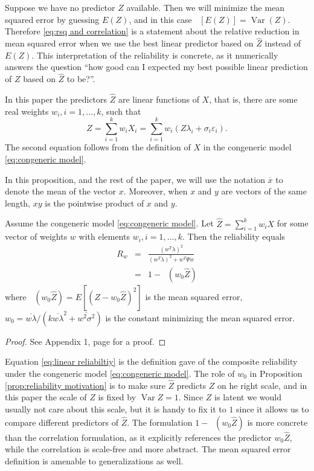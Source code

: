 \documentclass[twoside]{article}
\DeclareMathOperator{\Var}{Var}
\DeclareMathOperator{\MSE}{MSE_Z}
\begin{document}
Suppose we have no predictor $\hat{Z}$ available. Then we will minimize the mean squared error by guessing $E(Z)$, and in this case $\MSE[E(Z)]=\Var(Z)$. Therefore \cref{eq:rsq and correlation} is a statement about the relative reduction in mean squared error when we use the best linear predictor based on $\hat{Z}$ instead of $E(Z)$. This interpretation of the reliability is concrete, as it numerically answers the question ``how good can I expected my best possible linear prediction of $Z$ based on $\hat{Z}$ to be?''.

In this paper the predictors $\hat{Z}$ are linear functions of $X$, that is, there are some real weights $w_{i},i=1,\ldots,k$, such that
\begin{equation}
\label{eq:Linear predictor}
\hat{Z} =  \sum_{i=1}^{k} w_{i}X_i = \sum_{i=1}^{k}w_{i}(Z\lambda_i + \sigma_{i} \varepsilon_i).\nonumber 
\end{equation}
The second equation follows from the definition of $X$ in the congeneric model \eqref{eq:congeneric model}. 

In this proposition, and the rest of the paper, we will use the notation $\overline{x}$ to denote the mean of the vector $x$. Moreover, when $x$ and $y$ are vectors of the same length, $xy$ is the pointwise product of $x$ and $y$.

\begin{prop}
\label{prop:reliability motivation}Assume the congeneric model \eqref{eq:congeneric model}. Let $\hat{Z}=\sum_{i=1}^{k}w_{i}X$
for some vector of weights $w$ with elements $w_{i},i=1,\ldots,k$. Then the reliability equals
\begin{eqnarray}
 R_w & = & \frac{(w^{T}\lambda)^{2}}{(w^{T}\lambda)^{2}+w^{T}\Psi w}\label{eq:linear reliabiltiy}\\
 & = & 1- \MSE (w_{0}\hat{Z})\label{eq:MSE}
\end{eqnarray}
where $\MSE (w_{0}\hat{Z})=E[(Z-w_{0}\hat{Z})^{2}]$ is the
mean squared error, $w_{0}=\overline{w\lambda}/(k\overline{w\lambda}^{2}+\overline{w^{2}\sigma^{2}})$ is the constant minimizing the mean squared error.
\end{prop}
\begin{proof}
See Appendix 1, page \pageref{proof:reliability motivation} for a proof.
\end{proof}

Equation \eqref{eq:linear reliabiltiy} is the definition \citet[][p. 112]{Joreskog1971-nn} gave of the composite reliability under the congeneric model \eqref{eq:congeneric model}. 
The role of $w_0$ in Proposition \ref{prop:reliability motivation} is to make sure $\hat{Z}$ predicts $Z$ on he right scale, and in this paper the scale of $Z$ is fixed by $\Var Z = 1$. Since $Z$ is latent we would usually not care about this scale, but it is handy to fix it to $1$ since it allows us to compare different predictors of $\hat{Z}$. The formulation $1-\MSE (w_{0}\hat{Z})$ is more concrete than the correlation formulation, as it explicitly references the predictor $w_{0}\hat{Z}$, while the correlation is scale-free and more abstract. The mean squared error definition is amenable to generalizations as well.
\end{document}
